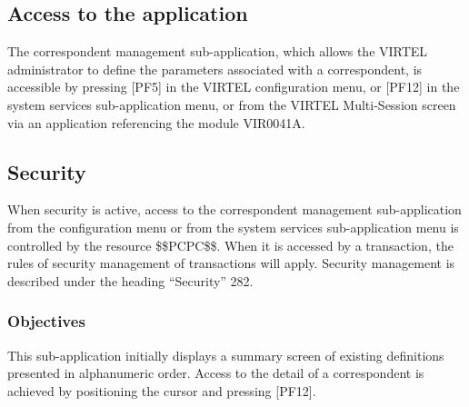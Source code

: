 \documentclass[letterpaper,10pt,english]{sphinxmanual}
\begin{document}
\subsection{Access to the application}
\label{\detokenize{User_Guide:access-to-the-application}}
The correspondent management sub-application, which allows the VIRTEL administrator to define the parameters
associated with a correspondent, is accessible by pressing {[}PF5{]} in the VIRTEL configuration menu, or {[}PF12{]} in the
system services sub-application menu, or from the VIRTEL Multi-Session screen via an application referencing the
module VIR0041A.


\subsection{Security}
\label{\detokenize{User_Guide:id3}}
When security is active, access to the correspondent management sub-application from the configuration menu or
from the system services sub-application menu is controlled by the resource \$\$PCPC\$\$.
When it is accessed by a transaction, the rules of security management of transactions will apply.
Security management is described under the heading “Security” 282.


\subsubsection{Objectives}
\label{\detokenize{User_Guide:objectives}}
This sub-application initially displays a summary screen of existing definitions presented in alphanumeric order. Access
to the detail of a correspondent is achieved by positioning the cursor and pressing {[}PF12{]}.



\end{document}
